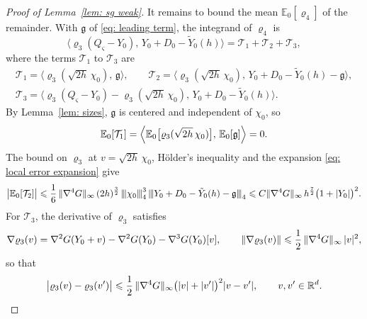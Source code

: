 \begin{proof}[Proof of Lemma~\ref{lem: sg weak}]
    It remains to bound the mean $\mathbb E_0[\varrho_4]$ of the remainder. With $\mathfrak g$ of \eqref{eq: leading term}, the integrand of $\varrho_4$ is
    \begin{equation}
        \bigl\langle \varrho_3(Q_\varsigma - Y_0),\, Y_0 + D_0 - \tilde Y_0(h) \bigr\rangle = \mathcal T_1 + \mathcal T_2 + \mathcal T_3 ,
        \label{eq: remainder split}
    \end{equation}
    where the terms $\mathcal T_1$ to $\mathcal T_3$ are
    \begin{equation*}
    \begin{gathered}
        \mathcal T_1 = \bigl\langle \varrho_3(\sqrt{2h}\, \chi_0),\, \mathfrak g \bigr\rangle , \qquad
        \mathcal T_2 = \bigl\langle \varrho_3(\sqrt{2h}\, \chi_0),\, Y_0 + D_0 - \tilde Y_0(h) - \mathfrak g \bigr\rangle , \\
        \mathcal T_3 = \bigl\langle \varrho_3(Q_\varsigma - Y_0) - \varrho_3(\sqrt{2h}\, \chi_0),\, Y_0 + D_0 - \tilde Y_0(h) \bigr\rangle .
    \end{gathered}
    \end{equation*}
    By Lemma~\ref{lem: sizes}, $\mathfrak g$ is centered and independent of $\chi_0$, so
    \begin{equation*}
        \mathbb E_0[\mathcal T_1] = \Bigl\langle \mathbb E_0\bigl[ \varrho_3(\sqrt{2h}\, \chi_0) \bigr],\, \mathbb E_0[\mathfrak g] \Bigr\rangle = 0 .
    \end{equation*}
    The bound on $\varrho_3$ at $v = \sqrt{2h}\, \chi_0$, H\"older's inequality and the expansion \eqref{eq: local error expansion} give
    \begin{equation*}
        \bigl| \mathbb E_0[\mathcal T_2] \bigr| \leqslant \frac16\, \lVert \nabla^4 G \rVert_\infty\, (2h)^{\frac32}\, {\vert\kern-0.25ex\vert\kern-0.25ex\vert} \chi_0 {\vert\kern-0.25ex\vert\kern-0.25ex\vert}_4^3\, {\vert\kern-0.25ex\vert\kern-0.25ex\vert} Y_0 + D_0 - \tilde Y_0(h) - \mathfrak g {\vert\kern-0.25ex\vert\kern-0.25ex\vert}_4 \leqslant C \lVert \nabla^4 G \rVert_\infty\, h^{\frac72} \bigl( 1+|Y_0| \bigr)^{2} .
    \end{equation*}
    For $\mathcal T_3$, the derivative of $\varrho_3$ satisfies
    \begin{equation*}
        \nabla \varrho_3(v) = \nabla^2 G(Y_0 + v) - \nabla^2 G(Y_0) - \nabla^3 G(Y_0)[v] , \qquad \lVert \nabla \varrho_3(v) \rVert \leqslant \frac12\, \lVert \nabla^4 G \rVert_\infty\, |v|^2 ,
    \end{equation*}
    so that
    \begin{equation*}
        \bigl| \varrho_3(v) - \varrho_3(v') \bigr| \Le \frac12\, \norm{\nabla^4 G}_\infty \bigl( |v| + |v'| \bigr)^2 |v - v'| , \qquad v, v' \in \mathbb R^d .

\end{equation*}
\end{proof}
